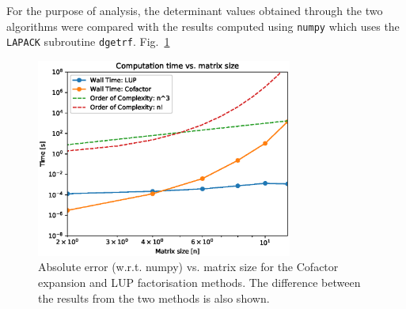 \documentclass[11pt, oneside]{article}
\begin{document}
For the purpose of analysis, the determinant values obtained through the two algorithms were compared with the results computed using \texttt{numpy} which uses the \texttt{LAPACK} subroutine \texttt{dgetrf}. Fig.~\ref{fig:2}
\begin{figure}[h]
      \centering
      \includegraphics[width=0.75\textwidth]{figure/Figure_1.eps}
      \caption{Absolute error (w.r.t. numpy)  vs. matrix size for the Cofactor expansion and LUP factorisation methods. The difference between the results from the two methods is also shown.}
      \label{fig:2}
\end{figure}
\end{document}
